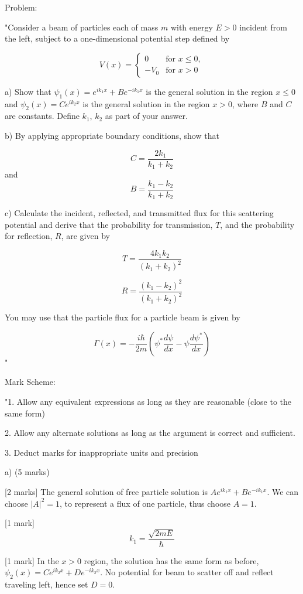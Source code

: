 Problem:

"Consider a beam of particles each of mass \( m \) with energy \( E > 0 \) incident from the left, subject to a one-dimensional potential step defined by

\[ V(x) = \begin{cases}
0 & \text{for } x \leq 0,\\
-V_{0}  & \text{for } x > 0 
\end{cases} \]

a) Show that \( \psi_{1}(x) = e^{ik_{1}x} + Be^{-ik_{1}x} \) is the general solution in the region \( x \leq 0 \) and \( \psi_{2}(x) = Ce^{ik_{2}x} \) is the general solution in the region \( x > 0 \), where \( B \) and \( C \) are constants. Define \( k_{1} \), \( k_{2} \) as part of your answer.

b) By applying appropriate boundary conditions, show that 

\[ C = \frac{2k_{1}}{k_{1}+k_{2}} \] and \[ B = \frac{k_{1}-k_{2}}{k_{1}+k_{2}} \]

c) Calculate the incident, reflected, and transmitted flux for this scattering potential and derive that the probability for transmission, \( T \), and the probability for reflection, \( R \), are given by 

\[ T = \frac{4k_{1}k_{2}}{(k_{1}+k_{2})^{2}} \]

\[ R = \frac{(k_{1}-k_{2})^{2}}{(k_{1}+k_{2})^{2}} \]

You may use that the particle flux for a particle beam is given by 

\[ \Gamma(x) = -\frac{i\hbar}{2m} \left(\psi^{*}\frac{d\psi}{dx} - \psi\frac{d\psi^{*}}{dx} \right) \]"

Mark Scheme:

"1. Allow any equivalent expressions as long as they are reasonable (close to the same form)

2. Allow any alternate solutions as long as the argument is correct and sufficient. 

3. Deduct marks for inappropriate units and precision

a) (5 marks)

[2 marks] The general solution of free particle solution is \( Ae^{ik_{1}x} + Be^{-ik_{1}x} \). We can choose \( |A|^{2} = 1 \), to represent a flux of one particle, thus choose \( A = 1 \). 

[1 mark] \[ k_1 = \frac{\sqrt{2mE}}{\hbar} \]

[1 mark] In the \( x > 0 \) region, the solution has the same form as before, \( \psi_{2}(x) = Ce^{ik_{2}x} + De^{-ik_{2}x} \). No potential for beam to scatter off and reflect traveling left, hence set \( D = 0 \). 


